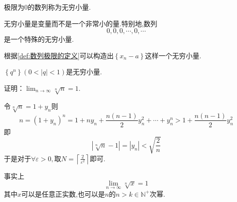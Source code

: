 \begin{formal}
    \begin{definition}[无穷小量的定义]\label{def:无穷小量的定义}
        极限为$0$的数列称为无穷小量.
    \end{definition}
\end{formal}
\begin{red}
    \begin{remark}
        无穷小量是变量而不是一个非常小的量.特别地,数列\[
        0,0,0,\cdots,0,\cdots
        \]是一个特殊的无穷小量.
    \end{remark}
\end{red}
\begin{green}
\begin{corollary}[无穷小量的推出]\label{cor:无穷小量的推出}
    根据\cref{def:数列极限的定义}可以构造出$\left\{
        x_n-a
    \right\}$这样一个无穷小量.
\end{corollary}
\end{green}
\begin{brown}
    \begin{example}
        $\left\{q^n\right\}\left(0<\left|q\right|<1\right)$是无穷小量.
    \end{example}
\end{brown}
\begin{brown}
    \begin{example}
        证明：$\displaystyle \lim_{n\to\infty}\sqrt[n]{n}=1.$
    \end{example}
    \begin{Proof}
        令$\displaystyle \sqrt[n]{n}=1+y_n$则\[
        n=\left(1+y_n\right)^n=1+ny_n+\frac{n\left(n-1\right)}{2}y_n^2+\cdots+y_n^n>1+\frac{n\left(n-1\right)}{2}y_n^2
        \]即\[
        \left|\sqrt[n]{n}-1\right|=\left|y_n\right|<\sqrt{\frac{2}{n}}
        \]于是对于$\forall \varepsilon>0,$取$N=\left\lceil\displaystyle\frac{2}{\varepsilon^2}\right\rceil$即可.
    \end{Proof}
    事实上\[
    \lim_{n\to\infty}\sqrt[n]{x}=1
    \]其中$x$可以是任意正实数,也可以是$n$的$n>k\in\mathbb{N}^+$次幂.
\end{brown}
